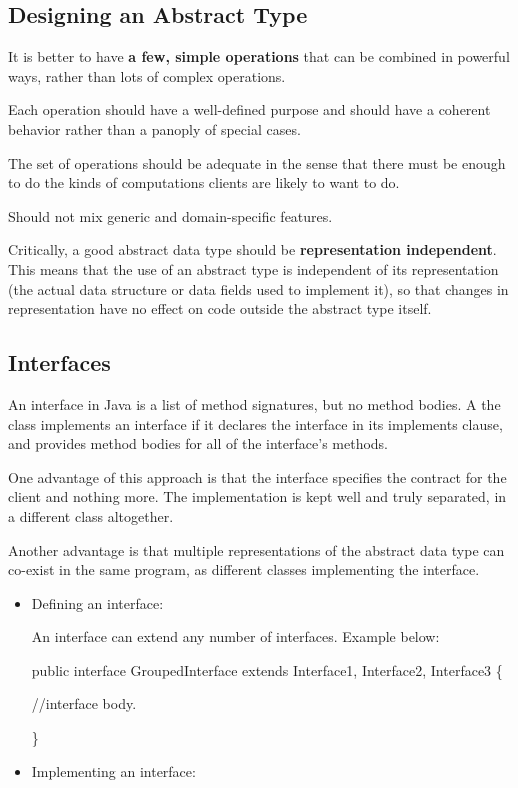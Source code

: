 \documentclass[letterpaper,12pt]{article}
\begin{document}
\subsection{Designing an Abstract Type}

It is better to have \textbf{a few, simple operations} that can be combined in
powerful ways, rather than lots of complex operations.

Each operation should have a well-defined purpose and should have a coherent
behavior rather than a panoply of special cases.

The set of operations should be adequate in the sense that there must be enough
to do the kinds of computations clients are likely to want to do.

Should not mix generic and domain-specific features.

Critically, a good abstract data type should be \textbf{representation
      independent}. This means that the use of an abstract type is independent of its
representation (the actual data structure or data fields used to implement it),
so that changes in representation have no effect on code outside the abstract
type itself.

\subsection{Interfaces}

An interface in Java is a list of method signatures, but no method bodies. A
the class implements an interface if it declares the interface in its implements
clause, and provides method bodies for all of the interface's methods.

One advantage of this approach is that the interface specifies the contract for
the client and nothing more. The implementation is kept well and truly
separated, in a different class altogether.

Another advantage is that multiple representations of the abstract
data type can co-exist in the same program, as different classes implementing
the interface.

\begin{itemize}
      \item Defining an interface:

            An interface can extend any number of interfaces. Example below:

            public interface GroupedInterface extends Interface1, Interface2, Interface3 \{

            //interface body.

            \}

      \item Implementing an interface:

\end{itemize}
\end{document}
